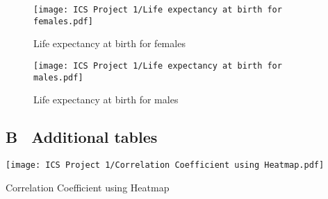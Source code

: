 \documentclass[12 pt]{scrartcl}
\begin{document}
\begin{figure}[ht]
    \centering
    \texttt{[image: ICS Project 1/Life expectancy at birth for females.pdf]}
    \caption{Life expectancy at birth for females}
    \label{fig:my_label}
\end{figure}

\begin{figure}[ht]
    \centering
    \texttt{[image: ICS Project 1/Life expectancy at birth for males.pdf]}
    \caption{Life expectancy at birth for males}
    \label{fig:my_label}
\end{figure}



\newpage\subsection*{B \ Additional tables}
\begin{table}[ht]
    \centering
    \texttt{[image: ICS Project 1/Correlation Coefficient using Heatmap.pdf]}
    \caption{Correlation Coefficient using Heatmap}
    \label{tab:my_label}
\end{table}

\end{document}
